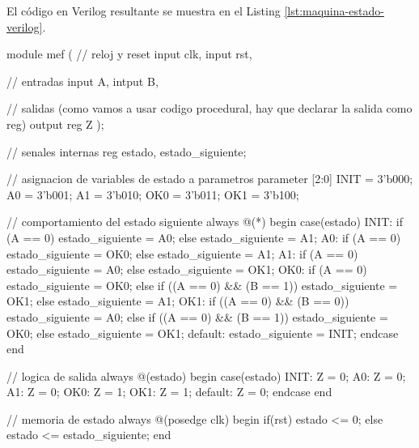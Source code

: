 El código en Verilog resultante se muestra en el Listing \ref{lst:maquina-estado-verilog}.

\begin{mycode}[style=verilogstyle, caption={Máquina de estado en Verilog.}, label=lst:maquina-estado-verilog]
module mef (
            // reloj y reset
            input clk,
            input rst,

            // entradas
            input A,
            intput B,

            // salidas (como vamos a usar codigo procedural, hay que declarar la salida como reg)
            output reg Z
           );

// senales internas
reg estado, estado_siguiente;

// asignacion de variables de estado a parametros
parameter [2:0] INIT = 3'b000;
                A0 = 3'b001;
                A1 = 3'b010;
                OK0 = 3'b011;
                OK1 = 3'b100;

// comportamiento del estado siguiente
always @(*) begin
    case(estado)
        INIT: if (A == 0) estado_siguiente = A0;
              else estado_siguiente = A1;
        A0: if (A == 0) estado_siguiente = OK0;
            else estado_siguiente = A1;
        A1: if (A == 0) estado_siguiente = A0;
            else estado_siguiente = OK1;
        OK0: if (A == 0) estado_siguiente = OK0;
             else if ((A == 0) && (B == 1)) estado_siguiente = OK1;
             else estado_siguiente = A1;
        OK1: if ((A == 0) && (B == 0)) estado_siguiente = A0;
        else if ((A == 0) && (B == 1)) estado_siguiente = OK0;
        else estado_siguiente = OK1;
        default: estado_siguiente = INIT;
    endcase
end

// logica de salida
always @(estado) begin
    case(estado)
        INIT: Z = 0;
        A0: Z = 0;
        A1: Z = 0;
        OK0: Z = 1;
        OK1: Z = 1;
        default: Z = 0;
    endcase
end

// memoria de estado
always @(posedge clk) begin
    if(rst)
        estado <= 0;
    else
        estado <= estado_siguiente;
end

\end{mycode}